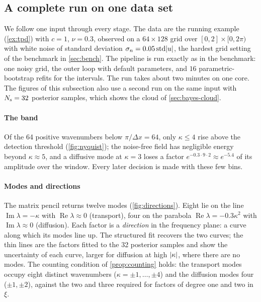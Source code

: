 \subsection{A complete run on one data set}\label{sec:worked}
We follow one input through every stage. The data are the running example (\cref{ex:tpd}) with $c=1$,
$\nu=0.3$, observed on a $64\times128$ grid over $[0,2]\times[0,2\pi)$ with white noise of standard deviation
$\sigma_{n}=0.05\,\mathrm{std}\lvert u\rvert$, the hardest grid setting of the benchmark in \cref{sec:bench}. The pipeline is
run exactly as in the benchmark: one noisy grid, the outer loop with default parameters, and $16$
parametric-bootstrap refits for the intervals. The run takes about two minutes on one core.
The figures of this subsection also use a second run on the same input with $N_{\mathrm s}=32$ posterior samples,
which shows the cloud of \cref{sec:bayes-cloud}.

\paragraph{The band} Of the 64 positive wavenumbers below $\pi/\Delta x=64$, only $\kappa\le4$ rise above the
detection threshold (\cref{fig:nyquist}); the noise-free field has negligible energy beyond $\kappa\approx5$, and
a diffusive mode at $\kappa=3$ loses a factor $e^{-0.3\cdot9\cdot2}\approx e^{-5.4}$ of its amplitude over the
window. Every later decision is made with these few bins.


\paragraph{Modes and directions} The matrix pencil returns twelve modes (\cref{fig:directions}). Eight lie on
the line $\operatorname{Im}\lambda=-\kappa$ with $\operatorname{Re}\lambda\approx0$ (transport), four on the parabola
$\operatorname{Re}\lambda=-0.3\kappa^2$ with $\operatorname{Im}\lambda\approx0$ (diffusion). Each factor is a
\emph{direction} in the frequency plane: a curve along which its modes line up. The structured fit
recovers the two curves; the thin lines are the factors fitted to the 32 posterior samples and show the
uncertainty of each curve, larger for diffusion at high $\lvert\kappa\rvert$, where there are no modes. The counting
condition of \cref{prop:counting} holds: the transport modes occupy eight distinct wavenumbers
($\kappa=\pm1,\dots,\pm4$) and the diffusion modes four ($\pm1,\pm2$), against the two and three required
for factors of degree one and two in $\xi$.

